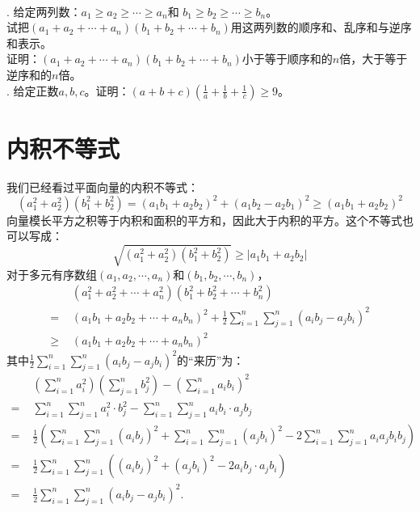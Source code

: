 \documentclass[12pt,UTF8]{ctexbook}
\begin{document}
\begin{xt}    
    \mbox{}\\
    . 给定两列数：$a_1 \geqslant a_2 \geqslant \cdots \geqslant a_n$和
$b_1 \geqslant b_2 \geqslant \cdots \geqslant b_n$。\\
     试把$(a_1 + a_2 + \cdots + a_n)(b_1 + b_2 + \cdots + b_n)$用这两列数的顺序和、乱序和与逆序和表示。\\
     证明：$(a_1 + a_2 + \cdots + a_n)(b_1 + b_2 + \cdots + b_n)$小于等于顺序和的$n$倍，大于等于逆序和的$n$倍。 \\
    . 给定正数$a,b,c$。证明：$(a + b + c)(\frac{1}{a}+\frac{1}{b}+\frac{1}{c}) \geqslant 9$。
\end{xt}

\section{内积不等式}

我们已经看过平面向量的内积不等式：
$$
(a_1^2 + a_2^2)(b_1^2 + b_2^2) = (a_1b_1 + a_2b_2)^2 + (a_1b_2 - a_2b_1)^2 \geqslant (a_1b_1 + a_2b_2)^2
$$
向量模长平方之积等于内积和面积的平方和，因此大于内积的平方。这个不等式也可以写成：
$$
\sqrt{(a_1^2 + a_2^2)(b_1^2 + b_2^2)} \geqslant |a_1b_1 + a_2b_2|
$$
对于多元有序数组$(a_1, a_2, \cdots, a_n)$和$(b_1, b_2, \cdots, b_n)$，
\begin{align*}
&(a_1^2 + a_2^2 + \cdots + a_n^2)(b_1^2 + b_2^2 + \cdots + b_n^2)  \\
=\,\,& (a_1b_1 + a_2b_2 + \cdots + a_nb_n)^2 + \frac{1}{2}\sum_{i=1}^n\sum_{j=1}^n(a_ib_j - a_jb_i)^2  \\
\geqslant\,\,& (a_1b_1 + a_2b_2 + \cdots + a_nb_n)^2  
\end{align*}
其中$\frac{1}{2}\sum_{i=1}^n\sum_{j=1}^n(a_ib_j - a_jb_i)^2$的“来历”为：
\begin{align*}
&\left(\sum_{i=1}^n a_i^2\right) \left(\sum_{j=1}^n b_j^2\right) - \left(\sum_{i=1}^n a_ib_i\right)^2  \\
=\,\,& \sum_{i=1}^n\sum_{j=1}^n a_i^2 \cdot b_j^2 - \sum_{i=1}^n\sum_{j=1}^n a_ib_i\cdot a_jb_j  \\
=\,\,& \frac{1}{2}\left(\sum_{i=1}^n\sum_{j=1}^n (a_ib_j)^2 + \sum_{i=1}^n\sum_{j=1}^n (a_jb_i)^2 -  2 \sum_{i=1}^n\sum_{j=1}^n a_ia_jb_ib_j \right)  \\
=\,\,& \frac{1}{2}\sum_{i=1}^n\sum_{j=1}^n \left( (a_ib_j)^2 + (a_jb_i)^2 -  2 a_ib_j\cdot a_jb_i \right)  \\ 
=\,\,& \frac{1}{2}\sum_{i=1}^n\sum_{j=1}^n \left( a_ib_j - a_jb_i \right)^2.  
\end{align*}
\end{document}
